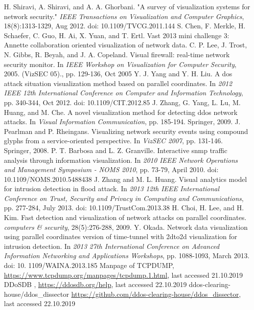 \begin{thebibliography}{99}
 H. Shiravi, A. Shiravi, and A. A. Ghorbani. "A survey of visualization systems for network security." \textit{IEEE Transactions on Visualization and Computer Graphics}, 18(8):1313-1329, Aug 2012. doi: 10.1109/TVCG.2011.144
 S. Chen, F. Merkle, H. Schaefer, C. Guo, H. Ai, X. Yuan, and T. Ertl. Vast 2013 mini challenge 3: Annette collaboration oriented visualization of network data.
 C. P. Lee, J. Trost, N. Gibbs, R. Beyah, and J. A. Copeland. Visual firewall: real-time network security monitor. In \textit{IEEE Workshop on Visualization for Computer Security}, 2005. (VizSEC 05)., pp. 129-136, Oct 2005
 Y. J. Yang and Y. H. Liu. A dos attack situation visualization method based on parallel coordinates. In \textit{2012 IEEE 12th International Conference on Computer and Information Technology}, pp. 340-344, Oct 2012. doi: 10.1109/CIT.2012.85
 J. Zhang, G. Yang, L. Lu, M. Huang, and M. Che. A novel visualization method for detecting ddos network attacks. In \textit{Visual Information Communication}, pp. 185-194. Springer, 2009.
 J. Pearlman and P. Rheingans. Visualizing network security events using compound glyphs from a service-oriented perspective. In \textit{VizSEC 2007}, pp. 131-146. Springer, 2008.
 P. T. Barbosa and L. Z. Granville. Interactive snmp traffic analysis through information visualization. In \textit{2010 IEEE Network Operations and Management Symposium - NOMS 2010}, pp. 73-79, April 2010. doi: 10.1109/NOMS.2010.5488438
 J. Zhang and M. L. Huang. Visual analytics model for intrusion detection in flood attack. In \textit{2013 12th IEEE International Conference on Trust, Security and Privacy in Computing and Communications}, pp. 277-284, July 2013. doi: 10.1109/TrustCom.2013.38
 H. Choi, H. Lee, and H. Kim. Fast detection and visualization of network attacks on parallel coordinates. \textit{computers \& security}, 28(5):276-288, 2009.
 Y. Okada. Network data visualization using parallel coordinates version of time-tunnel with 2dto2d visualization for intrusion detection. In \textit{2013 27th International Conference on Advanced Information Networking and Applications Workshops}, pp. 1088-1093, March 2013. doi: 10. 1109/WAINA.2013.185
Manpage of TCPDUMP, \url{https://www.tcpdump.org/manpages/tcpdump.1.html}, last accessed 21.10.2019
 DDoSDB , \url{https://ddosdb.org/help}, last accessed 22.10.2019
 ddos-clearing-house/ddos\_dissector \url{https://github.com/ddos-clearing-house/ddos_dissector}, last accessed 22.10.2019

\end{thebibliography}
